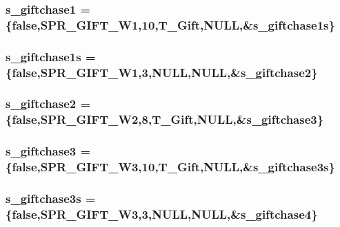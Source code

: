 \label{WL__ACT2_8C_a216d8ef5aaac32a48b60e5b348b84678}
\hypertarget{WL__ACT2_8C_a0a40f8197d12177d3e313cbed430ed05}{
\subsubsection[{s\_\-giftchase1}]{ {\bf s\_\-giftchase1} = \{false,SPR\_\-GIFT\_\-W1,10,T\_\-Gift,NULL,\&{\bf s\_\-giftchase1s}\}}}
\label{WL__ACT2_8C_a0a40f8197d12177d3e313cbed430ed05}
\hypertarget{WL__ACT2_8C_a5e3c6e535b9aa54261606409389672a4}{
\subsubsection[{s\_\-giftchase1s}]{ {\bf s\_\-giftchase1s} = \{false,SPR\_\-GIFT\_\-W1,3,NULL,NULL,\&{\bf s\_\-giftchase2}\}}}
\label{WL__ACT2_8C_a5e3c6e535b9aa54261606409389672a4}
\hypertarget{WL__ACT2_8C_a75dc21954eaaa0a38f56c87cdcd134e3}{
\subsubsection[{s\_\-giftchase2}]{ {\bf s\_\-giftchase2} = \{false,SPR\_\-GIFT\_\-W2,8,T\_\-Gift,NULL,\&{\bf s\_\-giftchase3}\}}}
\label{WL__ACT2_8C_a75dc21954eaaa0a38f56c87cdcd134e3}
\hypertarget{WL__ACT2_8C_ae0b514d00a5624b824b097d493092cbe}{
\subsubsection[{s\_\-giftchase3}]{ {\bf s\_\-giftchase3} = \{false,SPR\_\-GIFT\_\-W3,10,T\_\-Gift,NULL,\&{\bf s\_\-giftchase3s}\}}}
\label{WL__ACT2_8C_ae0b514d00a5624b824b097d493092cbe}
\hypertarget{WL__ACT2_8C_a2c1c030f2327b8a06f1da9513739b7b2}{
\subsubsection[{s\_\-giftchase3s}]{ {\bf s\_\-giftchase3s} = \{false,SPR\_\-GIFT\_\-W3,3,NULL,NULL,\&{\bf s\_\-giftchase4}\}}}

